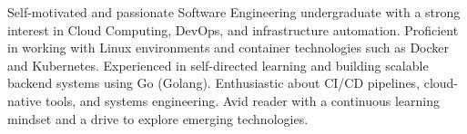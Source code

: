 
\begin{cvparagraph}

Self-motivated and passionate Software Engineering undergraduate with a strong interest in Cloud Computing, DevOps, and infrastructure automation. Proficient in working with Linux environments and container technologies such as Docker and Kubernetes. Experienced in self-directed learning and building scalable backend systems using Go (Golang). Enthusiastic about CI/CD pipelines, cloud-native tools, and systems engineering. Avid reader with a continuous learning mindset and a drive to explore emerging technologies.

\end{cvparagraph}
